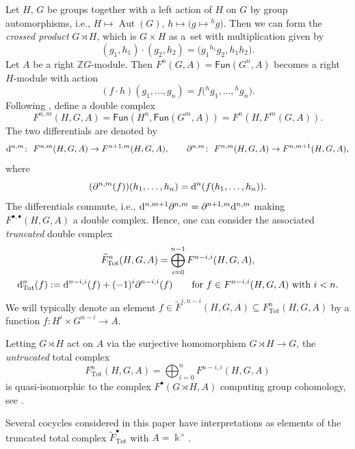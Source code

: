 \documentclass[10pt,a4paper]{amsart}
\numberwithin{equation}{section}
\newcommand{\Aut}{\operatorname{Aut}}
\newcommand{\deri}{{\rm d}}
\newcommand{\wF}{\widetilde{F}}
\newcommand{\Tot}{\mathrm{Tot}}
\newcommand{\Fun}{\mathsf{Fun}}
\newcommand{\mZ}{\mathbb{Z}}
\begin{document}
Let $H$, $G$ be groups together with a left action of $H$ on $G$ by group automorphisms, i.e., $H\mapsto \Aut(G)$, $h\mapsto \big(g\mapsto {}^hg\big)$. Then we can form the \emph{crossed product}
$G\rtimes H$, which is $G\times H$ as a~set with multiplication given by
\[(g_1,h_1)\cdot (g_2,h_2)=\big(g_1{}^{h_1}g_2,h_1h_2\big).\]
Let $A$ be a right $\mZ G$-module. Then $F^n(G,A)=\Fun(G^n,A)$ becomes a right $H$-module with action
\[(f\cdot h)(g_1,\dots, g_n)=f\big({}^hg_1,\dots, {}^hg_n\big).\]
Following \cite[Appendix~A]{DS}, define a double complex
\[F^{n,m}(H,G,A)=\Fun(H^{n},\Fun(G^m,A))=F^n(H,F^m(G,A)).\]
The two differentials are denoted by
\[\deri^{n,m}\colon\ F^{n,m}(H,G,A)\to F^{n+1,m}(H,G,A), \qquad \partial^{n,m} \colon\ F^{n,m}(H,G,A)\to F^{n,m+1}(H,G,A),\]
where
\[(\partial^{n,m}(f))(h_1,\dots, h_n)=\deri^n(f(h_1,\dots, h_n)).\]
The differentials commute, i.e., $\deri^{n,m+1}\partial^{n,m}=\partial^{n+1,m}\deri^{n,m}$ making $F^{\bullet,\bullet}(H,G,A)$ a double complex. Hence, one can consider the associated \emph{truncated} double complex
\begin{gather*}
\wF_{\Tot}^{n}(H,G,A)=\bigoplus_{i=0}^{n-1}F^{n-i,i}(H,G,A),\\
\deri_{\Tot}^n(f):=\deri^{n-i,i}(f)+(-1)^i\partial^{n-i,i}(f) \qquad \text{for $f\in F^{n-i,i}(H,G,A)$ with $i<n$}.
\end{gather*}
We will typically denote an element $f\in \wF^{i,n-i}(H,G,A)\subseteq F_{\Tot}^{n}(H,G,A)$ by a function
$f\colon H^i\times G^{n-i} \to A$.

Letting $G\rtimes H$ act on $A$ via the surjective homomorphism $G\rtimes H\to G$, the \emph{untrucated} total complex
\[F_{\Tot}^n(H,G,A)=\bigoplus_{i=0}^{n} F^{n-i,i}(H,G,A)\] is quasi-isomorphic to the complex $F^\bullet(G\rtimes H,A)$ computing group cohomology, see \cite{HS}.

Several cocycles considered in this paper have interpretations as elements of the truncated total complex $\wF_{\Tot}^{\bullet}$ with $A=\Bbbk^\times$.
\end{document}
